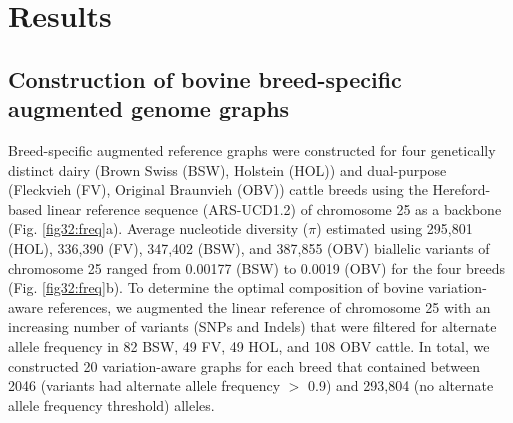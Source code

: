 \documentclass[../main.tex]{subfiles}
\begin{document}
\section{Results}

\subsection*{Construction of bovine breed-specific augmented genome graphs}

Breed-specific augmented reference graphs were constructed for four genetically distinct dairy (Brown Swiss (BSW), Holstein (HOL)) and dual-purpose (Fleckvieh (FV), Original Braunvieh (OBV)) cattle breeds using the Hereford-based linear reference sequence (ARS-UCD1.2) of chromosome 25 as a backbone (Fig. \ref{fig32:freq}a). Average nucleotide diversity ($\pi$) estimated using 295,801 (HOL), 336,390 (FV), 347,402 (BSW), and 387,855 (OBV) biallelic variants of chromosome 25 ranged from 0.00177 (BSW) to 0.0019 (OBV) for the four breeds (Fig. \ref{fig32:freq}b). To determine the optimal composition of bovine variation-aware references, we augmented the linear reference of chromosome 25 with an increasing number of variants (SNPs and Indels) that were filtered for alternate allele frequency in 82 BSW, 49 FV, 49 HOL, and 108 OBV cattle. In total, we constructed 20 variation-aware graphs for each breed that contained between 2046 (variants had alternate allele frequency $>$ 0.9) and 293,804 (no alternate allele frequency threshold) alleles.
\end{document}
